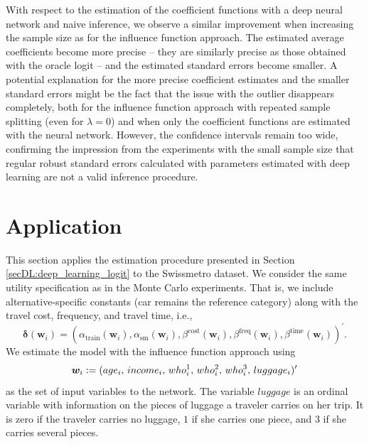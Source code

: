 \documentclass[a4paper, 12pt]{article}
\begin{document}
With respect to the estimation of the coefficient functions with a deep neural network and naive inference, we observe a similar improvement when increasing the sample size as for the influence function approach. The estimated average coefficients become more precise -- they are similarly precise as those obtained with the oracle logit -- and the estimated standard errors become smaller. A potential explanation for the more precise coefficient estimates and the smaller standard errors might be the fact that the issue with the outlier disappears completely, both for the influence function approach with repeated sample splitting (even for $\lambda=0$) and when only the coefficient functions are estimated with the neural network.
However, the confidence intervals remain too wide, confirming the impression from the experiments with the small sample size that regular robust standard errors calculated with parameters estimated with deep learning are not a valid inference procedure.




\section{Application} \label{secDL:Application}

This section applies the estimation procedure presented in Section \ref{secDL:deep_learning_logit} to the Swissmetro dataset. 
We consider the same utility specification as in the Monte Carlo experiments. That is, we include alternative-specific constants (car remains the reference category) along with the travel cost, frequency, and travel time, i.e.,  
\[ \bm{\delta}(\bm{w}_i)= \left(\alpha_{\text{train}}\left(\bm{w}_i\right), \alpha_{\text{sm}}\left(\bm{w}_i\right), \beta^{\text{cost}}\left(\bm{w}_i\right),\beta^\text{freq}\left(\bm{w}_i\right),  \beta^{\text{time}}\left(\bm{w}_i\right) \right)^{\prime}. \] 
We estimate the model with the influence function approach using 
\begin{equation}
\bm{w}_i := (age_i,\, income_i,\, who^1_i,\, who^2_i,\, who^3_i,\,luggage_i)^{\prime}\notag 
\end{equation}
as the set of input variables to the network. The variable $luggage$ is an ordinal variable with information on the pieces of luggage a traveler carries on her trip. It is zero if the traveler carries no luggage, $1$ if she carries one piece, and $3$ if she carries several pieces. 
\end{document}
